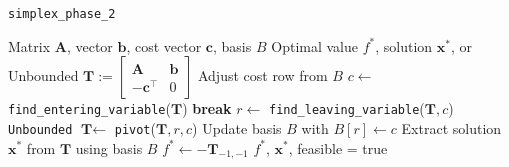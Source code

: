 \documentclass[conference]{IEEEtran}
\begin{document}
    \begin{algorithm}
        \caption{\texttt{simplex\_phase\_2}}
        \label{alg:phase2}
        \begin{algorithmic}[1]
        \Require Matrix $\textbf{A}$, vector $\textbf{b}$, cost vector $\textbf{c}$, basis $B$
        \Ensure Optimal value $f^*$, solution $\textbf{x}^*$, or Unbounded
        \State $\textbf{T} := \begin{bmatrix} \textbf{A} & \textbf{b} \\ -\textbf{c}^\top & 0 \end{bmatrix}$
        \State Adjust cost row from $B$ 
            \State $c \gets$ \texttt{find\_entering\_variable}($\textbf{T}$)
                \State \textbf{break} 
            \EndIf
            \State $r \gets$ \texttt{find\_leaving\_variable}($\textbf{T}, c$)
                \State \Return \texttt{Unbounded}
            \EndIf
            \State $\textbf{T} \gets$ \texttt{pivot}($\textbf{T}, r, c$)
            \State Update basis $B$ with $B[r] \gets c$
        \EndWhile
        \State Extract solution $\textbf{x}^*$ from $\textbf{T}$ using basis $B$
        \State $f^* \gets -\textbf{T}_{-1, -1}$ 
        \State \Return $f^*$, $\textbf{x}^*$, feasible = true
        \end{algorithmic}
    \end{algorithm}



\end{document}
